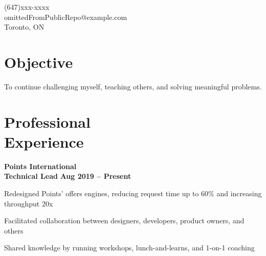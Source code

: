 \documentclass[margin,line]{resume}
\begin{document}
\sffamily %

{
	\sc
    \hfill (647)xxx-xxxx                  \vspace{0mm}\\\vspace{0mm}
    \hfill omittedFromPublicRepo@example.com            \vspace{0mm}\\\vspace{0mm}
    \hfill Toronto, ON                \vspace{0mm}\\\vspace{-10mm}
}

\begin{resume}

\vspace{1mm}

    \section{\mysidestyle \textbf{\large{O}\small{bjective}}}

	\hspace{-3mm}To continue challenging myself, teaching others, and solving meaningful problems.



\sectionline

    \section{\mysidestyle \textbf{\large{P}\small{rofessional\\Experience}}}

    \hspace{-3mm}\textbf{\listing Points International} \vspace{2mm}\\\vspace{1mm}
    \hspace{1.2mm}\textbf{Technical Lead} \hfill \textbf{Aug 2019 -- Present}\vspace{1mm}
    \begin{list2}
        \item Redesigned Points’ offers engines, reducing request time up to 60\% and increasing throughput 20x
        \item Facilitated collaboration between designers, developers, product owners, and others
        \item Shared knowledge by running workshops, lunch-and-learns, and 1-on-1 coaching
    \end{list2}


\end{resume}
\end{document}
